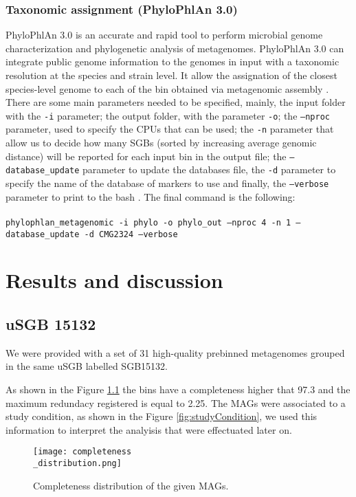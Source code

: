 \documentclass[a4paper,titlepage, oneside]{book}
\newcommand{\code}[1]{\colorbox{light-gray}{\texttt{#1}}}
\begin{document}
\subsection{Taxonomic assignment (PhyloPhlAn 3.0)}

PhyloPhlAn 3.0 is an accurate and rapid tool to perform microbial genome characterization and phylogenetic analysis of metagenomes. PhyloPhlAn 3.0 can integrate public genome information to the genomes in input with a taxonomic resolution at the species and strain level. It allow the assignation of the closest species-level genome to each of the bin obtained via metagenomic assembly \cite{Phylo}.
There are some main parameters needed to be specified, mainly, the input folder with the \code{-i} parameter; the output folder, with the parameter \code{-o}; the \code{--nproc} parameter, used to specify the CPUs that can be used; the \code{-n} parameter that allow us to decide  how many SGBs (sorted by increasing average genomic distance) will be reported for each input bin in the output file; the \code{--database\_update} parameter to update the databases file, the \code{-d} parameter to specify the name of the database of markers to use and finally, the \code{--verbose} parameter to print to the bash \cite{PhyloGuide}.
The final command is the following:\\ \newline \\ \code{phylophlan\_metagenomic -i phylo -o phylo\_out --nproc 4 -n 1 --database\_update -d CMG2324 --verbose}

\chapter{Results and discussion}

\section{uSGB 15132}

We were provided with a set of 31 high-quality prebinned metagenomes grouped in the same uSGB labelled SGB15132.

As shown in the Figure \ref{fig:compl} the bins have a completeness higher that 97.3 and the maximum redundacy registered is equal to 2.25.
The MAGs were associated to a study condition, as shown in the Figure \ref{fig:studyCondition}, we used this information to interpret the analyisis that were effectuated later on.

\begin{figure}[ht]
\centering
\texttt{[image: completeness\\\_distribution.png]}
\caption{Completeness distribution of the given MAGs.}
\label{fig:compl}
\end{figure}
\end{document}
